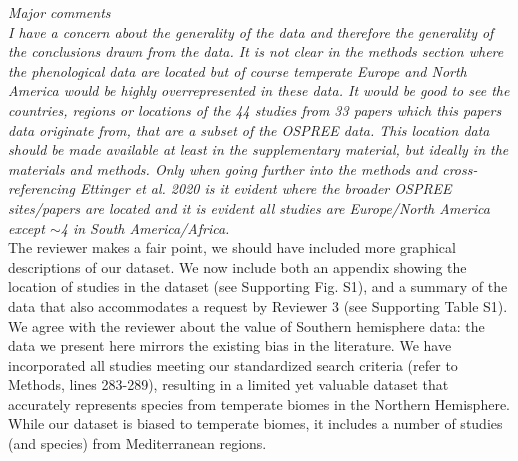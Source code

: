\documentclass[11pt]{article}
\begin{document}
\emph{Major comments}\\
\emph{I have a concern about the generality of the data and therefore the generality of the conclusions drawn from the data. It is not clear in the methods section where the phenological data are located but of course temperate Europe and North America would be highly overrepresented in these data. It would be good to see the countries, regions or locations of the 44 studies from 33 papers which this papers data originate from, that are a subset of the OSPREE data. This location data should be made available at least in the supplementary material, but ideally in the materials and methods. Only when going further into the methods and cross-referencing Ettinger et al. 2020 is it evident where the broader OSPREE sites/papers are located and it is evident all studies are Europe/North America except $\sim$4 in South America/Africa.}\\


The reviewer makes a fair point, we should have included more graphical descriptions of our dataset. We now include both an appendix showing the location of studies in the dataset (see Supporting Fig. S1), and a summary of the data that also accommodates a request by Reviewer 3 (see Supporting Table S1). We agree with the reviewer about the value of Southern hemisphere data: the data we present here mirrors the existing bias in the literature. We have incorporated all studies meeting our standardized search criteria (refer to Methods, lines 283-289), resulting in a limited yet valuable dataset that accurately represents species from temperate biomes in the Northern Hemisphere. While our dataset is biased to temperate biomes, it includes a number of studies (and species) from Mediterranean regions.\\
\end{document}
